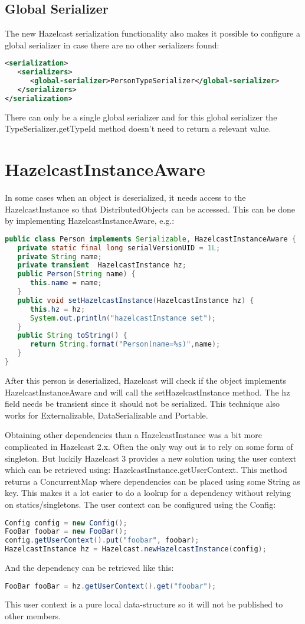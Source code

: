 \subsection{Global Serializer}
The new Hazelcast serialization functionality also makes it possible to configure a global serializer in case there are no other serializers found:
\begin{lstlisting}[language=xml]
<serialization>
   <serializers>
      <global-serializer>PersonTypeSerializer</global-serializer>
   </serializers>
</serialization>
\end{lstlisting}
There can only be a single global serializer and for this global serializer the TypeSerializer.getTypeId method doesn't need to return a relevant value.

\section{HazelcastInstanceAware}
In some cases when an object is deserialized, it needs access to the HazelcastInstance so that DistributedObjects can be accessed. This can be done by implementing HazelcastInstanceAware, e.g.:
\begin{lstlisting}[language=java]
public class Person implements Serializable, HazelcastInstanceAware {
   private static final long serialVersionUID = 1L;
   private String name;
   private transient  HazelcastInstance hz;
   public Person(String name) {
      this.name = name;
   }
   public void setHazelcastInstance(HazelcastInstance hz) {
      this.hz = hz;
      System.out.println("hazelcastInstance set");
   }
   public String toString() {
      return String.format("Person(name=%s)",name);
   }
}
\end{lstlisting}
After this person is deserialized, Hazelcast will check if the object implements HazelcastInstanceAware and will call the setHazelcastInstance method. The hz field needs be transient since it should not be serialized. This technique also works for Externalizable, DataSerializable and Portable.

Obtaining other dependencies than a HazelcastInstance was a bit more complicated in Hazelcast 2.x. Often the only way out is to rely on some form of singleton. But luckily Hazelcast 3 provides a new solution using the user context which can be retrieved using: HazelcastInstance.getUserContext. This method returns a ConcurrentMap where dependencies can be placed using some String as key. This makes it a lot easier to do a lookup for a dependency without relying on statics/singletons. The user context can be configured using the Config:
\begin{lstlisting}[language=java]
Config config = new Config();
FooBar foobar = new FooBar();
config.getUserContext().put("foobar", foobar);
HazelcastInstance hz = Hazelcast.newHazelcastInstance(config);
\end{lstlisting}
And the dependency can be retrieved like this:
\begin{lstlisting}[language=java]
FooBar fooBar = hz.getUserContext().get("foobar");
\end{lstlisting}
This user context is a pure local data-structure so it will not be published to other members.

